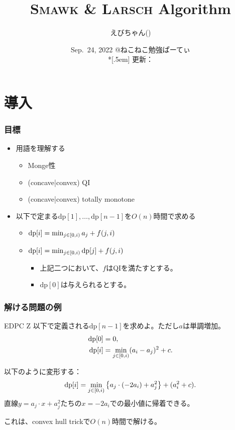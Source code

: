 \documentclass[
  lualatex,
  ja=standard,
  compress,
  hyperref={colorlinks, urlcolor=magenta, linkcolor=blue!55!black},
  dvipsnames,
  svgnames,
]{beamer}
\title{\textsc{Smawk} \& \textsc{Larsch} Algorithm}
\author[えびちゃん]{えびちゃん(\hspace{.05em}\textcolor{useryellow}{\lato{\textbf{rsk0315}}}\hspace{.05em})}
\date{Sep.~24, 2022 @ねこねこ勉強ぱーてぃ\\*[.5em]
  {\footnotesize 更新：}\directlua{commit_hash_and_date("\jobname.tex")}}
\newcommand{\DP}{\mathrm{dp}}
\begin{document}
\begin{frame}
  \maketitle
\end{frame}

\section{導入}
\begin{frame}
  \frametitle{目標}

  \begin{itemize}
  \item 用語を理解する
    \begin{itemize}
    \item Monge性
    \item (concave|convex) QI
    \item (concave|convex) totally monotone
    \end{itemize}
  \item 以下で定まる$\DP[1], \dots, \DP[n-1]$を$O(n)$時間で求める
    \begin{itemize}
    \item $\DP[i] = \min_{j\in\halfco{0}{i}} a_j + f(j, i)$
    \item $\DP[i] = \min_{j\in\halfco{0}{i}} \DP[j] + f(j, i)$
      \begin{itemize}
      \item 上記二つにおいて、$f$はQIを満たすとする。
      \item $\DP[0]$は与えられるとする。
      \end{itemize}
    \end{itemize}
  \end{itemize}
\end{frame}

\begin{frame}
  \frametitle{解ける問題の例 \theslidetopic}

  \begin{block}{EDPC Z}
    以下で定義される$\DP[n - 1]$を求めよ。ただし$a$は単調増加。
    $$
    \begin{aligned}
    \DP[0] &= 0, \\
    \DP[i] &= \min_{j\in\halfco{0}{i}} (a_i-a_j)^2+c. \\
    \end{aligned}
    $$
  \end{block}
  以下のように変形する：
  $$
  \DP[i] = \min_{j\in\halfco{0}{i}} \left\{a_j\cdot(-2a_i)+a_j^2\right\}+(a_i^2+c).
  $$
  直線$y = a_j\cdot x + a_j^2$たちの$x = -2a_i$での最小値に帰着できる。

  これは、convex hull trickで$O(n)$時間で解ける。
\end{frame}
\end{document}
